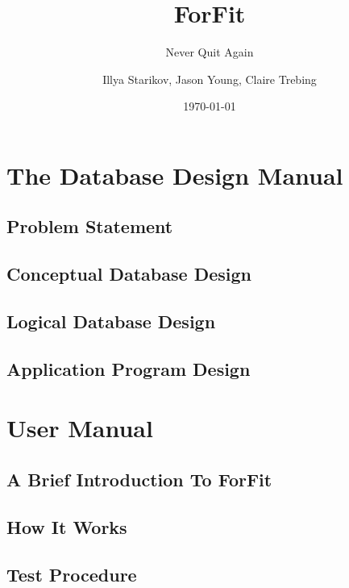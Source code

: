 \documentclass[oneside]{scrbook}
\title{ForFit}
\subtitle{Never Quit Again}
\author{Illya Starikov, Jason Young, Claire Trebing}
\date{\today}
\begin{document}
\maketitle
\tableofcontents

\part{The Database Design Manual}
\chapter{Problem Statement}


\chapter{Conceptual Database Design}
% 

\chapter{Logical Database Design}


\chapter{Application Program Design}


\part{User Manual}
\chapter{A Brief Introduction To ForFit}


\chapter{How It Works}


\chapter{Test Procedure}

\end{document}
